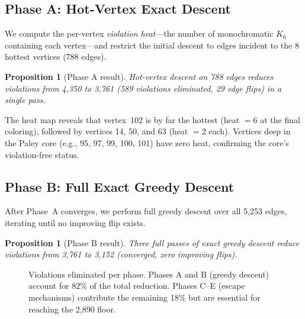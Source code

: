 \documentclass[11pt,a4paper]{article}
\theoremstyle{plain}
\newtheorem{proposition}[theorem]{Proposition}
\theoremstyle{remark}
\begin{document}
\subsection{Phase A: Hot-Vertex Exact Descent}

We compute the per-vertex \emph{violation heat}---the number of
monochromatic $K_6$ containing each vertex---and restrict the initial
descent to edges incident to the 8 hottest vertices (788 edges).

\begin{proposition}[Phase A result]\label{prop:phaseA}
Hot-vertex descent on 788 edges reduces violations from 4{,}350
to 3{,}761 (589 violations eliminated, 29 edge flips) in a single
pass.
\end{proposition}

The heat map reveals that vertex~102 is by far the hottest
(heat $= 6$ at the final coloring), followed by vertices 14, 50,
and 63 (heat $= 2$ each). Vertices deep in the Paley core
(e.g., 95, 97, 99, 100, 101) have zero heat, confirming the
core's violation-free status.

\subsection{Phase B: Full Exact Greedy Descent}

After Phase~A converges, we perform full greedy descent over all
5{,}253 edges, iterating until no improving flip exists.

\begin{proposition}[Phase B result]\label{prop:phaseB}
Three full passes of exact greedy descent reduce violations from
3{,}761 to 3{,}152 (converged, zero improving flips).
\end{proposition}

\begin{figure}[H]
\centering
{}
\caption{Violations eliminated per phase. Phases A and B (greedy
  descent) account for 82\% of the total reduction. Phases C--E
  (escape mechanisms) contribute the remaining 18\% but are essential
  for reaching the 2{,}890 floor.}
\label{fig:per-phase}
\end{figure}
\end{document}
